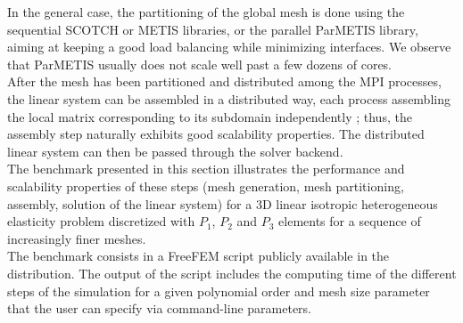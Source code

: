 In the general case, the partitioning of the global mesh is done using the sequential SCOTCH or METIS libraries, or the parallel ParMETIS library, aiming at keeping a good load balancing while minimizing interfaces. We observe that ParMETIS usually does not scale well past a few dozens of cores.\\

After the mesh has been partitioned and distributed among the MPI processes, the linear system can be assembled in a distributed way, each process assembling the local matrix corresponding to its subdomain independently ; thus, the assembly step naturally exhibits good scalability properties. The distributed linear system can then be passed through the solver backend.\\

The benchmark presented in this section illustrates the performance and scalability properties of these steps (mesh generation, mesh partitioning, assembly, solution of the linear system) for a 3D linear isotropic heterogeneous elasticity problem discretized with $P_1$, $P_2$ and $P_3$ elements for a sequence of increasingly finer meshes.\\
The benchmark consists in a FreeFEM script publicly available in the distribution. The output of the script includes the computing time of the different steps of the simulation for a given polynomial order and mesh size parameter that the user can specify via command-line parameters.

